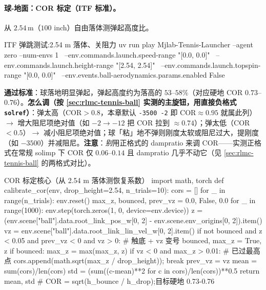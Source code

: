 \paragraph{球-地面：COR 标定（ITF 标准）。}从 $2.54$\,m（$100$ inch）自由落体测弹起高度比。

\begin{codebox}[bash]{ITF 弹跳测试:2.54 m 落体、关阻力}
uv run play Mjlab-Tennis-Launcher --agent zero --num-envs 1 \
  --env.commands.launch.speed-range "[0.0, 0.0]" \
  --env.commands.launch.height-range "[2.54, 2.54]" \
  --env.commands.launch.topspin-range "[0.0, 0.0]" \
  --env.events.ball-aerodynamics.params.enabled False
\end{codebox}

\textbf{通过标准}：球落地明显弹起，弹起高度约为落高的 $53$--$58\%$（对应硬地 COR $0.73$--$0.76$）。\textbf{怎么调（按 \cref{sec:rlmc-tennis-ball} 实测的主旋钮，用直接负格式 \texttt{solref}）}：弹太高（COR$>0.8$，本章默认 \texttt{-3500 -2} 即 COR$\approx0.95$ 就属此列）$\to$ 增大阻尼项绝对值（如 $-2\to-12$ 把 COR 拉到 $\approx0.74$）；弹太低（COR$<0.5$）$\to$ 减小阻尼项绝对值；球「粘」地不弹则刚度太软或阻尼过大，提刚度（如 $-3500$）并减阻尼。\textbf{注意}：\emph{别}用正格式的 dampratio 来调 COR——实测正格式在常规 solimp 下 COR 仅 $0.06$--$0.14$ 且 dampratio 几乎不动它（见 \cref{sec:rlmc-tennis-ball} 的两格式对比）。

\begin{codebox}[Python]{COR 标定核心（从 2.54 m 落体测恢复系数）}
import math, torch
def calibrate_cor(env, drop_height=2.54, n_trials=10):
    cors = []
    for _ in range(n_trials):
        env.reset()
        max_z, bounced, prev_vz = 0.0, False, 0.0
        for _ in range(1000):
            env.step(torch.zeros(1, 0, device=env.device))
            z  = (env.scene["ball"].data.root_link_pos_w[0, 2]
                  - env.scene.env_origins[0, 2]).item()
            vz = env.scene["ball"].data.root_link_lin_vel_w[0, 2].item()
            if not bounced and z < 0.05 and prev_vz < 0 and vz > 0:  # 触底 + vz 变号
                bounced, max_z = True, z
            if bounced:
                max_z = max(max_z, z)
                if vz < 0 and max_z > 0.01:                          # 已过最高点
                    cors.append(math.sqrt(max_z / drop_height)); break
            prev_vz = vz
    mean = sum(cors)/len(cors)
    std  = (sum((c-mean)**2 for c in cors)/len(cors))**0.5
    return mean, std
# COR = sqrt(h_bounce / h_drop);目标硬地 0.73-0.76
\end{codebox}

